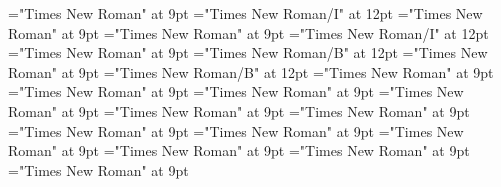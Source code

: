 \documentclass[gps1,twoside]{article}
\begin{document}
\font\lexsensereferencessensesensessensesensesentryafter="Times New Roman" at 9pt
\font\spanenownertypeabbreviationlexsensereferencelexsensereferencessensesensessensesensesentry="Times New Roman/I" at 12pt
\font\spanspanownertypeabbreviationlexsensereferencelexsensereferencessensesensessensesensesentrybefore="Times New Roman" at 9pt
\font\spanownertypeabbreviationlexsensereferencelexsensereferencessensesensessensesensesentrylastchildafter="Times New Roman" at 9pt
\font\spanownertypeabbreviationlexsensereferencelexsensereferencessensesensessensesensesentry="Times New Roman/I" at 12pt
\font\configtargetconfigtargetconfigtargetslexsensereferencelexsensereferencessensesensessensesensesentrybefore="Times New Roman" at 9pt
\font\spanbzhheadwordconfigtargetconfigtargetslexsensereferencelexsensereferencessensesensessensesensesentry="Times New Roman/B" at 12pt
\font\spanspanheadwordconfigtargetconfigtargetslexsensereferencelexsensereferencessensesensessensesensesentrybefore="Times New Roman" at 9pt
\font\spanheadwordconfigtargetconfigtargetslexsensereferencelexsensereferencessensesensessensesensesentry="Times New Roman/B" at 12pt
\font\variantformentrybackrefvariantformentrybackrefvariantformentrybackrefssensesensessensesensesentrybefore="Times New Roman" at 9pt
\font\variantformentrybackrefssensesensessensesensesentrybefore="Times New Roman" at 9pt
\font\variantformentrybackrefssensesensessensesensesentryafter="Times New Roman" at 9pt
\font\variantentrytypevariantentrytypevariantentrytypesvariantformentrybackrefvariantformentrybackrefssensesensessensesensesentrybefore="Times New Roman" at 9pt
\font\variantentrytypesvariantformentrybackrefvariantformentrybackrefssensesensessensesensesentryafter="Times New Roman" at 9pt
\font\spanspanreverseabbrvariantentrytypevariantentrytypesvariantformentrybackrefvariantformentrybackrefssensesensessensesensesentrybefore="Times New Roman" at 9pt
\font\spanreverseabbrvariantentrytypevariantentrytypesvariantformentrybackrefvariantformentrybackrefssensesensessensesensesentrylastchildafter="Times New Roman" at 9pt
\font\spanspanheadwordvariantformentrybackrefvariantformentrybackrefssensesensessensesensesentrybefore="Times New Roman" at 9pt
\font\spanspanowningentrysummarydefinitionvariantformentrybackrefvariantformentrybackrefssensesensessensesensesentrybefore="Times New Roman" at 9pt
\font\spanowningentrysummarydefinitionvariantformentrybackrefvariantformentrybackrefssensesensessensesensesentrylastchildafter="Times New Roman" at 9pt
\font\scientificnamesensesensessensesensesentryafter="Times New Roman" at 9pt
\font\semanticdomainsemanticdomainsemanticdomainssensesensessensesensesentrybefore="Times New Roman" at 9pt
\end{document}
